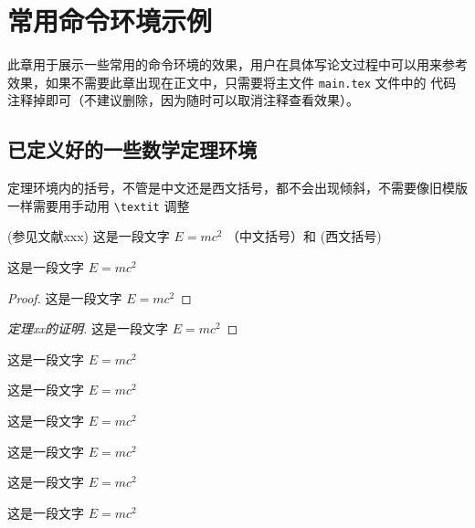 \chapter{常用命令环境示例}

此章用于展示一些常用的命令环境的效果，用户在具体写论文过程中可以用来参考效果，如果不需要此章出现在正文中，只需要将主文件 \verb|main.tex| 文件中的 \verb|| 代码注释掉即可（不建议删除，因为随时可以取消注释查看效果）。


\section{已定义好的一些数学定理环境}

定理环境内的括号，不管是中文还是西文括号，都不会出现倾斜，不需要像旧模版一样需要用手动用 \verb|\textit| 调整
\begin{definition}[测度]
  (参见文献xxx) 这是一段文字 $E = m c^2$  （中文括号）和 (西文括号)
\end{definition}

\begin{theorem}
  这是一段文字 $E = m c^2$
\end{theorem}

\begin{proof}
  这是一段文字 $E = m c^2$
\end{proof}

\begin{proof}[定理xx的证明]
  这是一段文字 $E = m c^2$
\end{proof}

\begin{example}
  这是一段文字 $E = m c^2$
\end{example}

\begin{property}
  这是一段文字 $E = m c^2$
\end{property}

\begin{proposition}
  这是一段文字 $E = m c^2$
\end{proposition}

\begin{corollary}
  这是一段文字 $E = m c^2$
\end{corollary}

\begin{lemma}
  这是一段文字 $E = m c^2$
\end{lemma}

\begin{axiom}
  这是一段文字 $E = m c^2$
\end{axiom}

